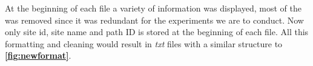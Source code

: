 
At the beginning of each file a variety of information was displayed, most of the was removed since it was redundant for the experiments we are to conduct. Now only site id, site name and path ID is stored at the beginning of each file. All this formatting and cleaning would result in \textit{txt} files with a similar structure to \textbf{\autoref{fig:newformat}}.


